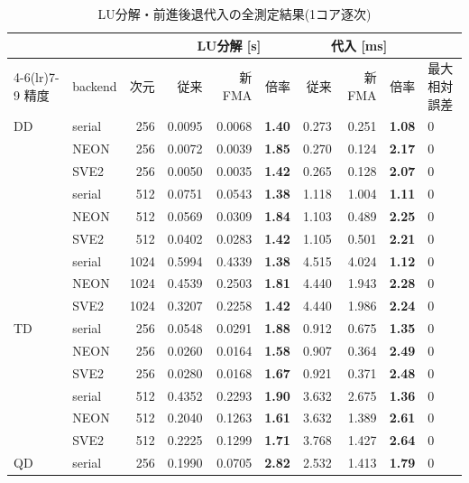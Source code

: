 \documentclass[a4j,dvipdfmx,11pt]{jsarticle}
\begin{document}
\begin{table}[p]
\centering
\caption{LU分解・前進後退代入の全測定結果(1コア逐次)}
\label{tab:full}
\footnotesize
\renewcommand{\arraystretch}{0.92}
\setlength{\tabcolsep}{4pt}
\begin{tabular}{llrrrrrrrl}
\toprule
 & & & \multicolumn{3}{c}{LU分解 [s]} & \multicolumn{3}{c}{代入 [ms]} & \\
\cmidrule(lr){4-6}\cmidrule(lr){7-9}
精度 & backend & 次元 & 従来 & 新FMA & 倍率 & 従来 & 新FMA & 倍率 & 最大相対誤差 \\
\midrule
DD & serial & 256 & 0.0095 & 0.0068 & \textbf{1.40} & 0.273 & 0.251 & \textbf{1.08} & $0$ \\
 & NEON & 256 & 0.0072 & 0.0039 & \textbf{1.85} & 0.270 & 0.124 & \textbf{2.17} & $0$ \\
 & SVE2 & 256 & 0.0050 & 0.0035 & \textbf{1.42} & 0.265 & 0.128 & \textbf{2.07} & $0$ \\
 & serial & 512 & 0.0751 & 0.0543 & \textbf{1.38} & 1.118 & 1.004 & \textbf{1.11} & $0$ \\
 & NEON & 512 & 0.0569 & 0.0309 & \textbf{1.84} & 1.103 & 0.489 & \textbf{2.25} & $0$ \\
 & SVE2 & 512 & 0.0402 & 0.0283 & \textbf{1.42} & 1.105 & 0.501 & \textbf{2.21} & $0$ \\
 & serial & 1024 & 0.5994 & 0.4339 & \textbf{1.38} & 4.515 & 4.024 & \textbf{1.12} & $0$ \\
 & NEON & 1024 & 0.4539 & 0.2503 & \textbf{1.81} & 4.440 & 1.943 & \textbf{2.28} & $0$ \\
 & SVE2 & 1024 & 0.3207 & 0.2258 & \textbf{1.42} & 4.440 & 1.986 & \textbf{2.24} & $0$ \\
\midrule
TD & serial & 256 & 0.0548 & 0.0291 & \textbf{1.88} & 0.912 & 0.675 & \textbf{1.35} & $0$ \\
 & NEON & 256 & 0.0260 & 0.0164 & \textbf{1.58} & 0.907 & 0.364 & \textbf{2.49} & $0$ \\
 & SVE2 & 256 & 0.0280 & 0.0168 & \textbf{1.67} & 0.921 & 0.371 & \textbf{2.48} & $0$ \\
 & serial & 512 & 0.4352 & 0.2293 & \textbf{1.90} & 3.632 & 2.675 & \textbf{1.36} & $0$ \\
 & NEON & 512 & 0.2040 & 0.1263 & \textbf{1.61} & 3.632 & 1.389 & \textbf{2.61} & $0$ \\
 & SVE2 & 512 & 0.2225 & 0.1299 & \textbf{1.71} & 3.768 & 1.427 & \textbf{2.64} & $0$ \\
\midrule
QD & serial & 256 & 0.1990 & 0.0705 & \textbf{2.82} & 2.532 & 1.413 & \textbf{1.79} & $0$ \\

\end{tabular}
\end{table}
\end{document}
